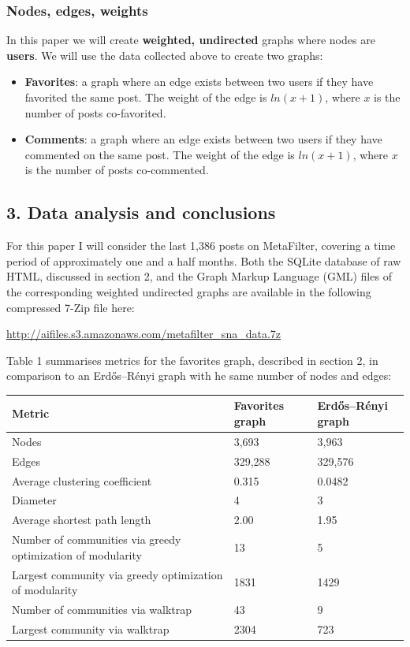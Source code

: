 \subsubsection{Nodes, edges, weights}

In this paper we will create \textbf{weighted, undirected} graphs where
nodes are \textbf{users}. We will use the data collected above to create
two graphs:

\begin{itemize}
\item
  \textbf{Favorites}: a graph where an edge exists between two users if
  they have favorited the same post. The weight of the edge is
  $ln(x+1)$, where $x$ is the number of posts co-favorited.
\item
  \textbf{Comments}: a graph where an edge exists between two users if
  they have commented on the same post. The weight of the edge is
  $ln(x+1)$, where $x$ is the number of posts co-commented.
\end{itemize}

\subsection{3. Data analysis and conclusions}

For this paper I will consider the last 1,386 posts on MetaFilter,
covering a time period of approximately one and a half months. Both the
SQLite database of raw HTML, discussed in section 2, and the Graph
Markup Language (GML) files of the corresponding weighted undirected
graphs are available in the following compressed 7-Zip file here:

\url{http://aifiles.s3.amazonaws.com/metafilter_sna_data.7z}

Table 1 summarises metrics for the favorites graph, described in section
2, in comparison to an Erdős--Rényi graph with he same number of nodes
and edges:

\begin{tabular}{|l|l|l|}\hline
Metric & Favorites graph & Erdős–Rényi graph \\ \hline
Nodes  & 3,693 & 3,963 \\
Edges  & 329,288 & 329,576 \\
Average clustering coefficient & 0.315 & 0.0482 \\
Diameter & 4 & 3 \\
Average shortest path length & 2.00 & 1.95 \\
Number of communities via greedy optimization of modularity & 13 & 5 \\
Largest community via greedy optimization of modularity & 1831 & 1429 \\
Number of communities via walktrap & 43 & 9 \\
Largest community via walktrap & 2304 & 723 \\
\end{tabular}

